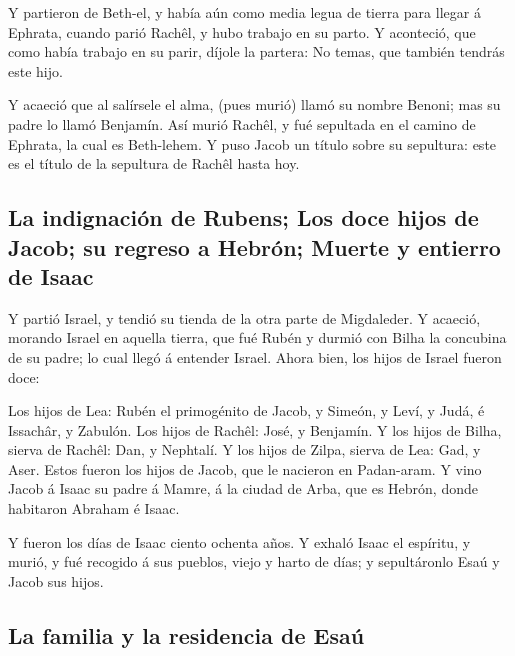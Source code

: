  Y partieron de Beth-el, y había aún como media legua de
tierra para llegar á Ephrata, cuando parió Rachêl, y hubo trabajo en su
parto.  Y aconteció, que como había trabajo en su parir,
díjole la partera: No temas, que también tendrás este hijo.

 Y acaeció que al salírsele el alma, (pues murió) llamó su
nombre Benoni; mas su padre lo llamó Benjamín.  Así murió
Rachêl, y fué sepultada en el camino de Ephrata, la cual es Beth-lehem.
 Y puso Jacob un título sobre su sepultura: este es el
título de la sepultura de Rachêl hasta hoy.

\hypertarget{la-indignaciuxf3n-de-rubens-los-doce-hijos-de-jacob-su-regreso-a-hebruxf3n-muerte-y-entierro-de-isaac}{%
\subsection{La indignación de Rubens; Los doce hijos de Jacob; su
regreso a Hebrón; Muerte y entierro de
Isaac}\label{la-indignaciuxf3n-de-rubens-los-doce-hijos-de-jacob-su-regreso-a-hebruxf3n-muerte-y-entierro-de-isaac}}

 Y partió Israel, y tendió su tienda de la otra parte de
Migdaleder.  Y acaeció, morando Israel en aquella tierra,
que fué Rubén y durmió con Bilha la concubina de su padre; lo cual llegó
á entender Israel. Ahora bien, los hijos de Israel fueron doce:

 Los hijos de Lea: Rubén el primogénito de Jacob, y Simeón,
y Leví, y Judá, é Issachâr, y Zabulón.  Los hijos de
Rachêl: José, y Benjamín.  Y los hijos de Bilha, sierva de
Rachêl: Dan, y Nephtalí.  Y los hijos de Zilpa, sierva de
Lea: Gad, y Aser. Estos fueron los hijos de Jacob, que le nacieron en
Padan-aram.  Y vino Jacob á Isaac su padre á Mamre, á la
ciudad de Arba, que es Hebrón, donde habitaron Abraham é Isaac.

 Y fueron los días de Isaac ciento ochenta años.
 Y exhaló Isaac el espíritu, y murió, y fué recogido á sus
pueblos, viejo y harto de días; y sepultáronlo Esaú y Jacob sus hijos.

\hypertarget{la-familia-y-la-residencia-de-esauxfa}{%
\subsection{La familia y la residencia de
Esaú}\label{la-familia-y-la-residencia-de-esauxfa}}

